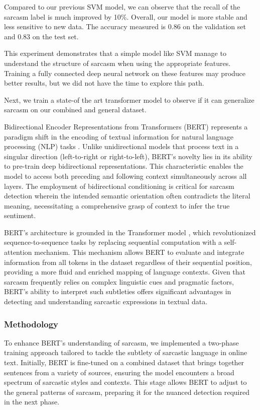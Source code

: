 \documentclass[10pt,twocolumn,letterpaper]{article}
\begin{document}
Compared to our previous SVM model, we can observe that the recall of the sarcasm label is much improved by 10\%.
Overall, our model is more stable and less sensitive to new data.
The accuracy measured is 0.86 on the validation set and 0.83 on the test set.

This experiment demonstrates that a simple model like SVM manage to understand the structure of sarcasm when using the appropriate features.
Training a fully connected deep neural network on these features may produce better results, but we did not have the time to explore this path.

Next, we train a state-of the art transformer model to observe if it can generalize sarcasm on our combined and general dataset.


Bidirectional Encoder Representations from Transformers (BERT) represents a paradigm shift in the encoding of textual information for natural language processing (NLP) tasks \cite{devlin2018bert}. Unlike unidirectional models that process text in a singular direction (left-to-right or right-to-left), BERT's novelty lies in its ability to pre-train deep bidirectional representations. This characteristic enables the model to access both preceding and following context simultaneously across all layers. The employment of bidirectional conditioning is critical for sarcasm detection wherein the intended semantic orientation often contradicts the literal meaning, necessitating a comprehensive grasp of context to infer the true sentiment.

BERT's architecture is grounded in the Transformer model \cite{vaswani2017attention}, which revolutionized sequence-to-sequence tasks by replacing sequential computation with a self-attention mechanism. This mechanism allows BERT to evaluate and integrate information from all tokens in the dataset regardless of their sequential position, providing a more fluid and enriched mapping of language contexts. Given that sarcasm frequently relies on complex linguistic cues and pragmatic factors, BERT's ability to interpret such subtleties offers significant advantages in detecting and understanding sarcastic expressions in textual data.

\subsubsection{Methodology}  
To enhance BERT's understanding of sarcasm, we implemented a two-phase training approach tailored to tackle the subtlety of sarcastic language in online text. Initially, BERT is fine-tuned on a combined dataset that brings together sentences from a variety of sources, ensuring the model encounters a broad spectrum of sarcastic styles and contexts. This stage allows BERT to adjust to the general patterns of sarcasm, preparing it for the nuanced detection required in the next phase.
\end{document}

